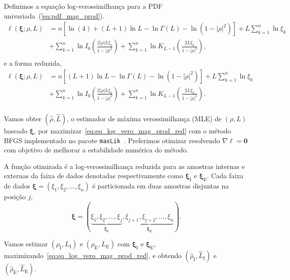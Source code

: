 Definimos a equação log-verossimilhança para a PDF univariada~(\ref{eq:pdf_mag_prod}).
\begin{equation}\nonumber
\begin{split}
    \ell(\bm\xi;\rho, L)&=n\left[\ln (4)+(L+1)\ln L-\ln\Gamma(L)-\ln(1-|\rho|^2)\right]+L\sum_{k=1}^{n} \ln\xi_k\\
                         &+\sum_{k=1}^{n}\ln I_0\left(\frac{2|\rho|L\xi_k}{1-|\rho|^2}\right)+ \sum_{k=1}^{n}\ln K_{L-1}\left(\frac{2L\xi_k}{1-|\rho|^2}\right),\\
\end{split}
 \end{equation}
e a forma reduzida,
\begin{equation}\label{eq:eq_log_vero_mag_prod_red}
\begin{split}
    \ell(\bm \xi;\rho, L)&=n\left[(L+1)\ln L-\ln\Gamma(L)-\ln(1-|\rho|^2)\right]+L\sum_{k=1}^{n} \ln\xi_k\\
                         &+\sum_{k=1}^{n}\ln I_0\left(\frac{2|\rho|L\xi_k}{1-|\rho|^2}\right)+ \sum_{k=1}^{n}\ln K_{L-1}\left(\frac{2L\xi_k}{1-|\rho|^2}\right).\\
\end{split}
 \end{equation} 

Vamos obter $(\widehat \rho, \widehat L)$, o estimador de máxima verossimilhança (MLE) de $(\rho, L)$ baseado $\bm \xi$, por maximizar~\eqref{eq:eq_log_vero_mag_prod_red} com o método BFGS implementado no pacote \texttt{maxLik}~\citep{ht}. Preferimos otimizar resolvendo $\nabla\ell=\bm 0$ com objetivo de melhorar a estabilidade numérica do método.

A função otimizada é a log-verossimilhança reduzida para as amostras internas e externas da faixa de dados denotadas respectivamente como $\bm \xi_\text{I}$ e $\bm \xi_\text{E}$. Cada faixa de dados $\bm \xi = (\xi_1,\xi_2,\dots,\xi_n)$ é particionada em duas amostras disjuntas na posição $j$,  
$$
\bm \xi = (\underbrace{\xi_1,\xi_2,\dots,\xi_j}_{\bm \xi_\text{I}}, 
\underbrace{\xi_{j+1}, \xi_{j+2},\dots,\xi_n}_{\bm \xi_\text{E}}).
$$

Vamos estimar $(\rho_\text{I},L_\text{I})$ e $(\rho_\text{E},L_\text{E})$ com $\bm \xi_\text{I}$ e $\bm \xi_\text{E}$, maximizando~\eqref{eq:eq_log_vero_mag_prod_red}, e obtendo $(\widehat{\rho}_\text{I}, \widehat{L}_\text{I})$ e $(\widehat{\rho}_\text{E}, \widehat{L}_\text{E})$.

